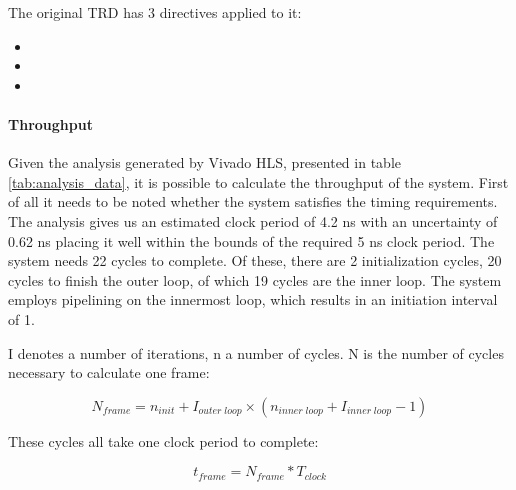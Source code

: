 The original TRD has 3 directives applied to it:

\begin{itemize}
\item {}
\item {}
\item {}
\end{itemize}

\paragraph{Throughput}
\label{sec:original_througput}
Given the analysis generated by Vivado HLS, presented in table \ref{tab:analysis_data}, it is possible to calculate the throughput of the system. First of all it needs to be noted whether the system satisfies the timing requirements. The analysis gives us an estimated clock period of 4.2 ns with an uncertainty of 0.62 ns placing it well within the bounds of the required 5 ns clock period.
The system needs 22 cycles to complete. Of these, there are 2 initialization cycles, 20 cycles to finish the outer loop, of which 19 cycles are the inner loop. The system employs pipelining on the innermost loop, which results in an initiation interval of 1.

I denotes a number of iterations, n a number of cycles. N is the number of cycles necessary to calculate one frame:

\begin{equation}\label{eq:nframes_orig_trd}
N_{frame} = n_{init} + I_{outer\;loop} \times ( n_{inner\;loop} + I_{inner\;loop} - 1 )
\end{equation}



These cycles all take one clock period to complete:

\begin{equation}\label{eq:frametime}
t_{frame} = N_{frame} * T_{clock}
\end{equation}

